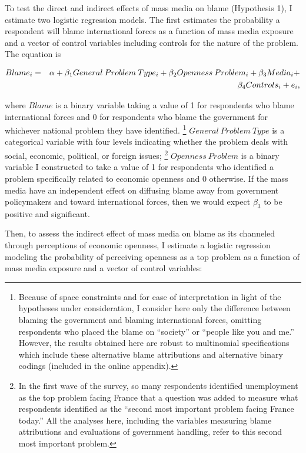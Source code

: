 \documentclass[12pt]{report}
\begin{document}
To test the direct and indirect effects of mass media on blame (Hypothesis 1), I estimate two
logistic regression models. The first estimates the probability a respondent will blame
international forces as a function of mass media exposure and a vector of control variables
including controls for the nature of the problem. The equation is

\begin{eqnarray} Blame_{i} & = & \alpha+\beta_{1}General\: Problem\: Type_{i}+\beta_{2}Openness\:
Problem_{i}+\beta_{3}Media_{i}+ \notag \\ &  & \beta_{4}Controls_{i}+e_{i}, \end{eqnarray}

\noindent where $Blame$ is a binary variable taking a value of 1 for respondents who blame
international forces and 0 for respondents who blame the government for whichever national problem
they have identified. \footnote{Because of space constraints and for ease of interpretation in
light of the hypotheses under consideration, I consider here only the difference between blaming the
government and blaming international forces, omitting respondents who placed the blame on
``society'' or ``people like you and me.'' However, the results obtained here are robust to
multinomial specifications which include these alternative blame attributions and alternative binary
codings (included in the online appendix).} $General\: Problem\: Type$ is a categorical variable
with four levels indicating whether the problem deals with social, economic, political, or foreign
issues; \footnote{In the first wave of the survey, so many respondents identified unemployment as
the top problem facing France that a question was added to measure what respondents identified as
the ``second most important problem facing France today.'' All the analyses here, including the
variables measuring blame attributions and evaluations of government handling, refer to this second
most important problem.} $Openness\: Problem$ is a binary variable I constructed to take a value
of 1 for respondents who identified a problem specifically related to economic openness and 0
otherwise. If the mass media have an independent effect on diffusing blame away from government
policymakers and toward international forces, then we would expect $\beta_{3}$ to be positive and
significant.

Then, to assess the indirect effect of mass media on blame as its channeled through perceptions of
economic openness, I estimate a logistic regression modeling the probability of perceiving openness
as a top problem as a function of mass media exposure and a vector of control variables:
\end{document}
